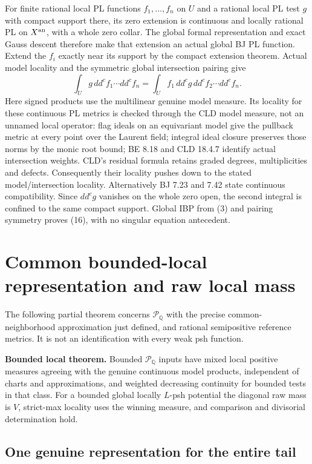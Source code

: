 \documentclass[
  11pt,
]{article}
\begin{document}
For finite rational local PL functions \(f_1,\ldots,f_n\) on \(U\) and a
rational local PL test \(g\) with compact support there, its zero
extension is continuous and locally rational PL on \(X^{\rm an}\), with
a whole zero collar. The global formal representation and exact Gauss
descent therefore make that extension an actual global BJ PL function.
Extend the \(f_i\) exactly near its support by the compact extension
theorem. Actual model locality and the symmetric global intersection
pairing give \[\int_U g\,dd^cf_1\cdots dd^cf_n
       =\int_U f_1\,dd^cg\,dd^cf_2\cdots dd^cf_n. \tag{16}\] Here signed
products use the multilinear genuine model measure. Its locality for
these continuous PL metrics is checked through the CLD model measure,
not an unnamed local operator: flag ideals on an equivariant model give
the pullback metric at every point over the Laurent field; integral
ideal closure preserves those norms by the monic root bound; BE 8.18 and
CLD 18.4.7 identify actual intersection weights. CLD's residual formula
retains graded degrees, multiplicities and defects. Consequently their
locality pushes down to the stated model/intersection locality.
Alternatively BJ 7.23 and 7.42 state continuous compatibility. Since
\(dd^cg\) vanishes on the whole zero open, the second integral is
confined to the same compact support. Global IBP from (3) and pairing
symmetry proves (16), with no singular equation antecedent.

\section{Common bounded-local representation and raw local
mass}\label{common-bounded-local-representation-and-raw-local-mass}

The following partial theorem concerns \(\mathcal P_{\mathbb Q}\) with
the precise common-neighborhood approximation just defined, and rational
semipositive reference metrics. It is not an identification with every
weak psh function.

\textbf{Bounded local theorem.} Bounded \(\mathcal P_{\mathbb Q}\)
inputs have mixed local positive measures agreeing with the genuine
continuous model products, independent of charts and approximations, and
weighted decreasing continuity for bounded tests in that class. For a
bounded global locally \(L\)-psh potential the diagonal raw mass is
\(V\), strict-max locality uses the winning measure, and comparison and
divisorial determination hold.

\subsection{One genuine representation for the entire
tail}\label{one-genuine-representation-for-the-entire-tail}
\end{document}
